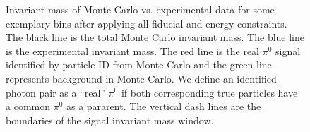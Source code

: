 \begin{figure}[H]
  \centering     
  \caption{Invariant mass of Monte Carlo vs. experimental data for some exemplary bins after applying all fiducial and energy constraints. The black line is the total Monte Carlo invariant mass. The blue line is the experimental invariant mass. The red line is the real $\pi^0$ signal identified by particle ID from Monte Carlo and the green line represents background in Monte Carlo. We define an identified photon pair as a ``real'' $\pi^0$ if both corresponding true particles have a common $\pi^0$ as a pararent. The vertical dash lines are the boundaries of the signal invariant mass window.}
  \label{fig:pi0MC_Exp}
\end{figure}


